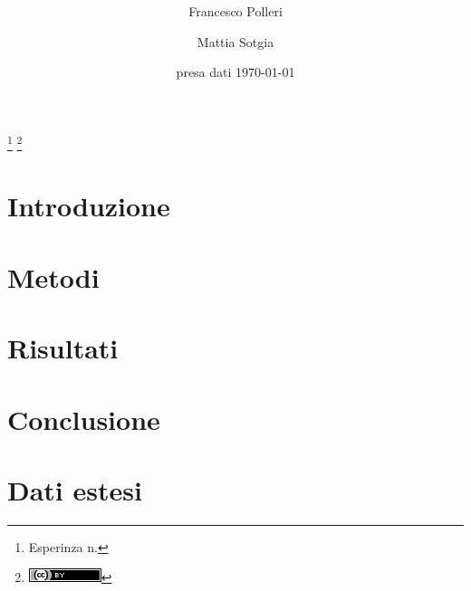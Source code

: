 \documentclass[
    rmp,
    reprint, 
    superscriptaddress, 
    altaffilletter, 
    amsmath, 
    amssymb, 
    a4paper]{revtex4-2}
\begin{document}
\title{%
}
\thanks{Esperinza n. %
}
\thanks{\includegraphics[scale=0.4]{style/80x15.png}}

\author{Francesco Polleri}
\author{Mattia Sotgia}


\date{presa dati
    \today
}

\begin{abstract}
    
\end{abstract}
\maketitle
\thispagestyle{fancy}


\section{Introduzione}
\label{section:introduction}


\section{Metodi}
\label{section:methods}


\section{Risultati}
\label{section:results}

\section{Conclusione}
\label{section:conclusion}

\appendix

\setcounter{table}{0}
\renewcommand{\thetable}{A-\Roman{table}}

\section{Dati estesi}
\end{document}
